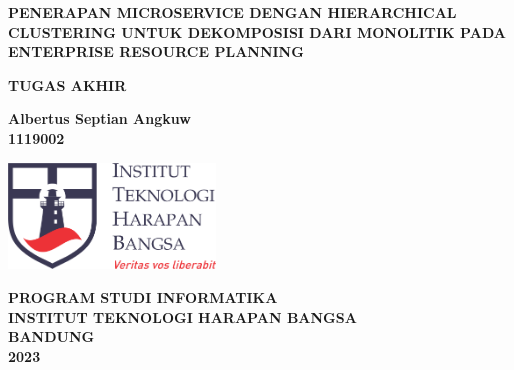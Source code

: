 \begin{titlepage}
	\begin{center}
		\vspace*{0cm}
		
		{\large \bfseries PENERAPAN MICROSERVICE DENGAN HIERARCHICAL CLUSTERING UNTUK DEKOMPOSISI DARI MONOLITIK PADA ENTERPRISE RESOURCE PLANNING \\}
			
		\vspace{3cm}
		
	 	{\large \bfseries TUGAS AKHIR}

		\vspace{2.5cm}
		
		{ \bfseries Albertus Septian Angkuw \\ 1119002 }
		
	
		\vspace*{\fill} 
		
		\includegraphics[width=5.5cm]{img/ithb.png}
	
		\vspace{2.5cm}

		{\large \bfseries PROGRAM STUDI INFORMATIKA \\
		INSTITUT TEKNOLOGI HARAPAN BANGSA \\
		BANDUNG\\
		2023}
		
		\vspace{1cm}
	\end{center}
\end{titlepage}